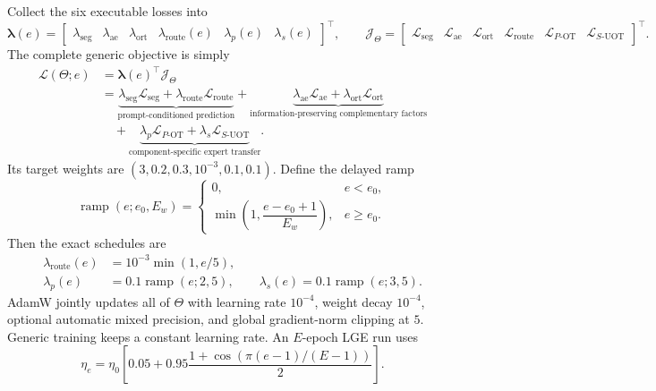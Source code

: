 \documentclass[10pt]{article}
\newcommand{\cL}{\mathcal{L}}
\begin{document}
Collect the six executable losses into
\begin{equation}
    \bm{\lambda}(e)=
    \begin{bmatrix}
      \lambda_{\mathrm{seg}}&\lambda_{\mathrm{ae}}&
      \lambda_{\mathrm{ort}}&\lambda_{\mathrm{route}}(e)&
      \lambda_p(e)&\lambda_s(e)
    \end{bmatrix}^{\!\top},
    \qquad
    \bm{\mathcal J}_\Theta=
    \begin{bmatrix}
      \cL_{\mathrm{seg}}&\cL_{\mathrm{ae}}&
      \cL_{\mathrm{ort}}&\cL_{\mathrm{route}}&
      \cL_{P\text{-OT}}&\cL_{S\text{-UOT}}
    \end{bmatrix}^{\!\top}.
\end{equation}
The complete generic objective is simply
\begin{equation}
\boxed{
\begin{aligned}
 \cL(\Theta;e)
 &=\bm{\lambda}(e)^\top\bm{\mathcal J}_\Theta\\
 &=\underbrace{
   \lambda_{\mathrm{seg}}\cL_{\mathrm{seg}}
   +\lambda_{\mathrm{route}}\cL_{\mathrm{route}}
   }_{\text{prompt-conditioned prediction}}
  +\underbrace{
   \lambda_{\mathrm{ae}}\cL_{\mathrm{ae}}
   +\lambda_{\mathrm{ort}}\cL_{\mathrm{ort}}
   }_{\text{information-preserving complementary factors}}\\
 &\quad
  +\underbrace{
   \lambda_p\cL_{P\text{-OT}}
   +\lambda_s\cL_{S\text{-UOT}}
   }_{\text{component-specific expert transfer}}.
\end{aligned}}
    \label{eq:master-objective}
\end{equation}
Its target weights are
$(3,0.2,0.3,10^{-3},0.1,0.1)$.  Define the delayed ramp
\begin{equation}
    \operatorname{ramp}(e;e_0,E_w)
    =\begin{cases}
      0,&e<e_0,\\
      \min\!\left(1,\dfrac{e-e_0+1}{E_w}\right),&e\geq e_0.
     \end{cases}
\end{equation}
Then the exact schedules are
\begin{equation}
\begin{aligned}
 \lambda_{\mathrm{route}}(e)&=10^{-3}\min(1,e/5),\\
 \lambda_p(e)&=0.1\operatorname{ramp}(e;2,5),\qquad
 \lambda_s(e)=0.1\operatorname{ramp}(e;3,5).
\end{aligned}
\label{eq:unified-schedules}
\end{equation}
AdamW jointly updates all of $\Theta$ with learning rate $10^{-4}$, weight
decay $10^{-4}$, optional automatic mixed precision, and global gradient-norm
clipping at $5$.  Generic training keeps a constant learning rate.  An
$E$-epoch LGE run uses
\begin{equation}
 \eta_e=\eta_0\left[0.05+0.95
 \frac{1+\cos(\pi(e-1)/(E-1))}{2}\right].
\end{equation}
\end{document}
